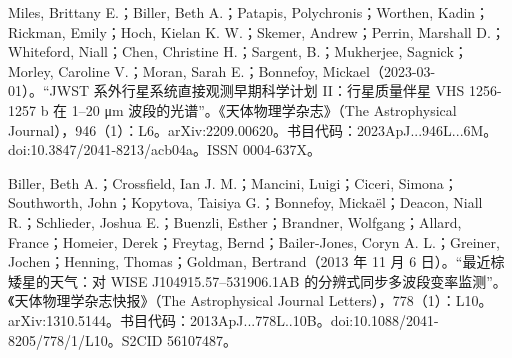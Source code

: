 \begin{enumerate}
Miles, Brittany E.；Biller, Beth A.；Patapis, Polychronis；Worthen, Kadin；Rickman, Emily；Hoch, Kielan K. W.；Skemer, Andrew；Perrin, Marshall D.；Whiteford, Niall；Chen, Christine H.；Sargent, B.；Mukherjee, Sagnick；Morley, Caroline V.；Moran, Sarah E.；Bonnefoy, Mickael（2023-03-01）。“JWST 系外行星系统直接观测早期科学计划 II：行星质量伴星 VHS 1256-1257 b 在 1–20 μm 波段的光谱”。《天体物理学杂志》（The Astrophysical Journal），946（1）：L6。arXiv:2209.00620。书目代码：2023ApJ...946L...6M。doi:10.3847/2041-8213/acb04a。ISSN 0004-637X。

Biller, Beth A.；Crossfield, Ian J. M.；Mancini, Luigi；Ciceri, Simona；Southworth, John；Kopytova, Taisiya G.；Bonnefoy, Mickaël；Deacon, Niall R.；Schlieder, Joshua E.；Buenzli, Esther；Brandner, Wolfgang；Allard, France；Homeier, Derek；Freytag, Bernd；Bailer-Jones, Coryn A. L.；Greiner, Jochen；Henning, Thomas；Goldman, Bertrand（2013 年 11 月 6 日）。“最近棕矮星的天气：对 WISE J104915.57–531906.1AB 的分辨式同步多波段变率监测”。《天体物理学杂志快报》（The Astrophysical Journal Letters），778（1）：L10。arXiv:1310.5144。书目代码：2013ApJ...778L..10B。doi:10.1088/2041-8205/778/1/L10。S2CID 56107487。

\end{enumerate}